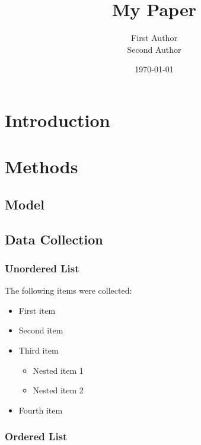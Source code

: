 \documentclass{article}
\title{My Paper}
\author{First Author\\ Second Author}
\date{\today}
\begin{document}
\maketitle

\newpage
\tableofcontents
\newpage
\listoftables
\newpage
\listoffigures
\newpage

\section{Introduction}

\lipsum[1-2]


\section{Methods}

\lipsum[3]


\subsection{Model}

\lipsum[10-11]

\subsection{Data Collection}

\lipsum[4]

\subsubsection{Unordered List}

The following items were collected:

\begin{itemize}
	\item First item
	\item Second item
	\item Third item
	\begin{itemize}
		\item Nested item 1
		\item Nested item 2
	\end{itemize}
	\item Fourth item
\end{itemize}

\subsubsection{Ordered List}
\end{document}
